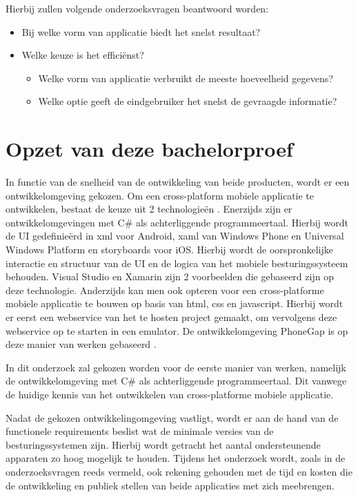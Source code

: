 Hierbij zullen volgende onderzoeksvragen beantwoord worden:
\begin{itemize}
  \item{Bij welke vorm van applicatie biedt het snelst resultaat?}
  \item{Welke keuze is het efficiënst?}
  \begin{itemize}
    \item{Welke vorm van applicatie verbruikt de meeste hoeveelheid gegevens?}
    \item{Welke optie geeft de eindgebruiker het snelst de gevraagde informatie?}
  \end{itemize}
\end{itemize}
\newpage
\section{Opzet van deze bachelorproef}
\label{sec:opzet-bachelorproef}
In functie van de snelheid van de ontwikkeling van beide producten, wordt er een ontwikkelomgeving gekozen.
Om een cross-platform mobiele applicatie te ontwikkelen, bestaat de keuze uit 2 technologieën . Enerzijds zijn er
ontwikkelomgevingen met C\# als achterliggende programmeertaal. Hierbij wordt de UI gedefinieërd in xml voor Android,
xaml van Windows Phone en Universal Windows Platform en storyboards voor iOS. Hierbij wordt de oorspronkelijke interactie
en structuur van de UI en de logica van het mobiele besturingssysteem behouden. Visual Studio en Xamarin zijn 2 voorbeelden
die gebaseerd zijn op deze technologie. Anderzijds kan men ook opteren voor een cross-platforme mobiele applicatie te bouwen op basis van html, css en javascript.
Hierbij wordt er eerst een webservice van het te hosten project gemaakt, om vervolgens deze webservice op te starten in een emulator.
De ontwikkelomgeving PhoneGap is op deze manier van werken gebaseerd \citep{adobesystemsinc2017}.

In dit onderzoek zal gekozen worden voor de eerste manier van werken, namelijk de ontwikkelomgeving met C\# als achterliggende
programmeertaal. Dit vanwege de huidige kennis van het ontwikkelen van cross-platforme mobiele applicatie.

Nadat de gekozen ontwikkelingomgeving vastligt, wordt er aan de hand van de functionele requirements beslist wat de
minimale versies van de besturingssystemen zijn. Hierbij wordt getracht het aantal ondersteunende apparaten zo hoog mogelijk te houden.
Tijdens het onderzoek wordt, zoals in de onderzoeksvragen reeds vermeld, ook rekening gehouden met de tijd en kosten die de ontwikkeling
en publiek stellen van beide applicaties met zich meebrengen.

